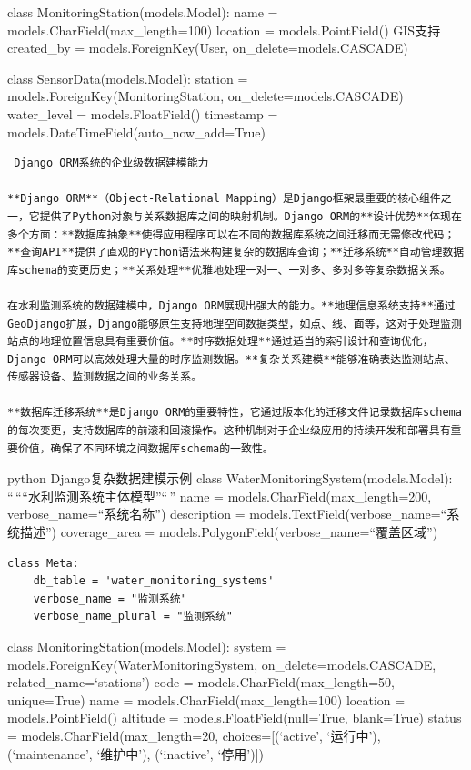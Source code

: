 class MonitoringStation(models.Model): name = models.CharField(max\_length=100) location = models.PointField()  GIS支持 created\_by = models.ForeignKey(User, on\_delete=models.CASCADE)

class SensorData(models.Model): station = models.ForeignKey(MonitoringStation, on\_delete=models.CASCADE) water\_level = models.FloatField() timestamp = models.DateTimeField(auto\_now\_add=True)

\begin{lstlisting}
 Django ORM系统的企业级数据建模能力

**Django ORM**（Object-Relational Mapping）是Django框架最重要的核心组件之一，它提供了Python对象与关系数据库之间的映射机制。Django ORM的**设计优势**体现在多个方面：**数据库抽象**使得应用程序可以在不同的数据库系统之间迁移而无需修改代码；**查询API**提供了直观的Python语法来构建复杂的数据库查询；**迁移系统**自动管理数据库schema的变更历史；**关系处理**优雅地处理一对一、一对多、多对多等复杂数据关系。

在水利监测系统的数据建模中，Django ORM展现出强大的能力。**地理信息系统支持**通过GeoDjango扩展，Django能够原生支持地理空间数据类型，如点、线、面等，这对于处理监测站点的地理位置信息具有重要价值。**时序数据处理**通过适当的索引设计和查询优化，Django ORM可以高效处理大量的时序监测数据。**复杂关系建模**能够准确表达监测站点、传感器设备、监测数据之间的业务关系。

**数据库迁移系统**是Django ORM的重要特性，它通过版本化的迁移文件记录数据库schema的每次变更，支持数据库的前滚和回滚操作。这种机制对于企业级应用的持续开发和部署具有重要价值，确保了不同环境之间数据库schema的一致性。
\end{lstlisting}

python  Django复杂数据建模示例 class WaterMonitoringSystem(models.Model): ``\,````水利监测系统主体模型''``\,'' name = models.CharField(max\_length=200, verbose\_name=``系统名称'') description = models.TextField(verbose\_name=``系统描述'') coverage\_area = models.PolygonField(verbose\_name=``覆盖区域'')

\begin{verbatim}
class Meta:
    db_table = 'water_monitoring_systems'
    verbose_name = "监测系统"
    verbose_name_plural = "监测系统"
\end{verbatim}

class MonitoringStation(models.Model): system = models.ForeignKey(WaterMonitoringSystem, on\_delete=models.CASCADE, related\_name=`stations') code = models.CharField(max\_length=50, unique=True) name = models.CharField(max\_length=100) location = models.PointField() altitude = models.FloatField(null=True, blank=True) status = models.CharField(max\_length=20, choices={[}(`active', `运行中'), (`maintenance', `维护中'), (`inactive', `停用'){]})

